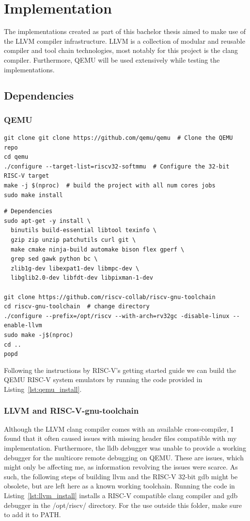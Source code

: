 \section{Implementation}
The implementations created as part of this bachelor thesis aimed to make use of
the LLVM compiler infrastructure. LLVM is a collection of modular and reusable
compiler and tool chain technologies, most notably for this project is the clang
compiler. Furthermore, QEMU will be used extensively while testing the
implementations.

\subsection{Dependencies}
\subsubsection*{QEMU}
\begin{lstlisting}[caption=Installing QEMU, label=lst:qemu_install, float]
git clone git clone https://github.com/qemu/qemu  # Clone the QEMU repo
cd qemu
./configure --target-list=riscv32-softmmu  # Configure the 32-bit RISC-V target
make -j $(nproc)  # build the project with all num cores jobs
sudo make install
\end{lstlisting}
\begin{lstlisting}[caption=Installing LLVM compiler infastructure with RISC-V
32-bit as native target., label=lst:llvm_install, float]
# Dependencies
sudo apt-get -y install \
  binutils build-essential libtool texinfo \
  gzip zip unzip patchutils curl git \
  make cmake ninja-build automake bison flex gperf \
  grep sed gawk python bc \
  zlib1g-dev libexpat1-dev libmpc-dev \
  libglib2.0-dev libfdt-dev libpixman-1-dev

git clone https://github.com/riscv-collab/riscv-gnu-toolchain
cd riscv-gnu-toolchain  # change directory
./configure --prefix=/opt/riscv --with-arch=rv32gc -disable-linux --enable-llvm
sudo make -j$(nproc)
cd ..
popd
\end{lstlisting}
Following the instructions by RISC-V's getting started guide
we can build the QEMU RISC-V system emulators by running the code
provided in Listing~\ref{lst:qemu_install}\cite{RISC-V_GS}.

\subsubsection*{LLVM and RISC-V-gnu-toolchain}
Although the LLVM clang compiler comes with an available cross-compiler, I found
that it often caused issues with missing header files compatible with my
implementation. Furthermore, the lldb debugger was unable to provide a working
debugger for the multicore remote debugging on QEMU. These are issues, which
might only be affecting me, as information revolving the issues were scarce. As
such, the following steps of building llvm and the RISC-V 32-bit gdb might be
obsolete, but are left here as a known working toolchain. Running the code in
Listing~\ref{lst:llvm_install} installs a RISC-V compatible clang compiler and
gdb debugger in the /opt/riscv/ directory. For the use outside this folder, make
sure to add it to PATH.

